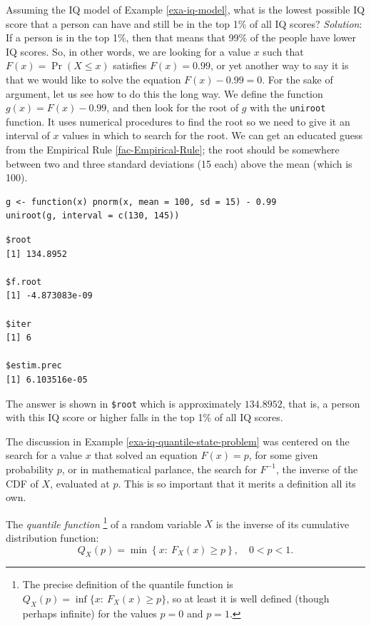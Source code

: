 \documentclass[captions=tableheading]{scrbook}
\begin{document}
\begin{example}
Assuming the IQ model of Example \ref{exa-iq-model}, what is the lowest possible IQ score that a person can have and still be in the top 1\% of all IQ scores?
\emph{Solution}: If a person is in the top 1\%, then that means that 99\% of the people have lower IQ scores. So, in other words, we are looking for a value \(x\) such that \(F(x)=\Pr(X\leq x)\) satisfies \(F(x)=0.99\), or yet another way to say it is that we would like to solve the equation \(F(x)-0.99=0\). For the sake of argument, let us see how to do this the long way. We define the function \(g(x)=F(x)-0.99\), and then look for the root of \(g\) with the \texttt{uniroot} function. It uses numerical procedures to find the root so we need to give it an interval of \(x\) values in which to search for the root. We can get an educated guess from the Empirical Rule \ref{fac-Empirical-Rule}; the root should be somewhere between two and three standard deviations (15 each) above the mean (which is 100).

\begin{verbatim}
g <- function(x) pnorm(x, mean = 100, sd = 15) - 0.99
uniroot(g, interval = c(130, 145))
\end{verbatim}


\begin{verbatim}
$root
[1] 134.8952

$f.root
[1] -4.873083e-09

$iter
[1] 6

$estim.prec
[1] 6.103516e-05
\end{verbatim}



The answer is shown in \texttt{\$root} which is approximately \(  134.8952 \), that is, a person with this IQ score or higher falls in the top 1\% of all IQ scores.
\end{example}

The discussion in Example \ref{exa-iq-quantile-state-problem} was centered on the search for a value \(x\) that solved an equation \(F(x)=p\), for some given probability \(p\), or in mathematical parlance, the search for \(F^{-1}\), the inverse of the CDF of \(X\), evaluated at \(p\). This is so important that it merits a definition all its own.

\begin{defn}
The \emph{quantile function}
\footnote{The precise definition of the quantile function is \(Q_{X}(p)=\inf \{ x:\ F_{X}(x)\geq p \}\), so at least it is well defined (though perhaps infinite) for the values \(p=0\) and \(p=1\).}
of a random variable \(X\) is the inverse of its cumulative distribution function:
\begin{equation}
Q_{X}(p)=\min\left\{ x:\ F_{X}(x)\geq p\right\} ,\quad 0 < p <1.
\end{equation}
\end{defn}
\end{document}
